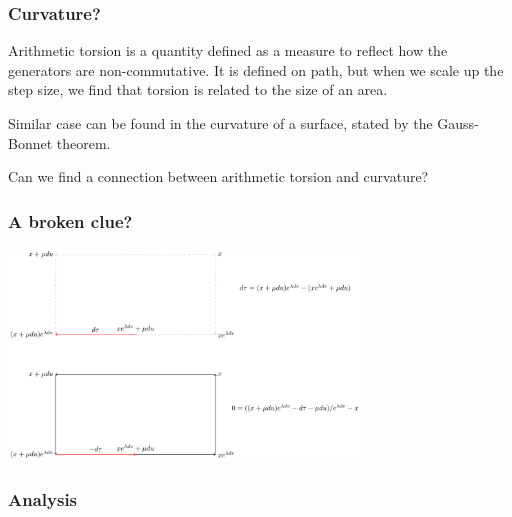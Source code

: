 \documentclass[aspectratio=169]{beamer}
\begin{document}
\begin{frame}
    \frametitle{Curvature?}
    Arithmetic torsion is a quantity defined as a measure to reflect how the generators are non-commutative.
    It is defined on path, but when we scale up the step size, we find that torsion is
    related to the size of an area.

    Similar case can be found in the curvature of a surface, stated by the Gauss-Bonnet theorem.

    Can we find a connection between arithmetic torsion and curvature?
\end{frame}

\begin{frame}
    \frametitle{A broken clue?}
    \begin{center}
        \includegraphics[width=0.7\textwidth]{../images/19-curl}
    \end{center}
\end{frame}

\begin{frame}
    \frametitle{Analysis}
    \begin{figure}[ht]\centering
    \end{figure}
\end{frame}
\end{document}
